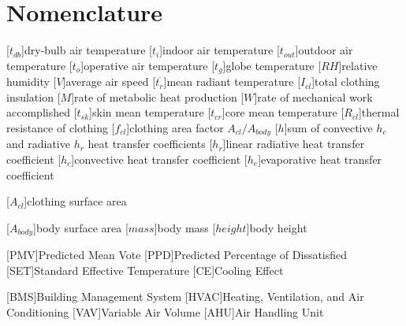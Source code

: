 
\section*{Nomenclature}
\renewcommand{\baselinestretch}{0.75}\normalsize
\begin{acronym}[longest]

[$t_{db}$]{dry-bulb air temperature}
[$t_{i}$]{indoor air temperature}
[$t_{out}$]{outdoor air temperature}
[$t_{o}$]{operative air temperature}
[$t_{g}$]{globe temperature}
[$RH$]{relative humidity\acroextra{, \%}}
[$V$]{average air speed}
[$\overline{t_{r}}$]{mean radiant temperature}
[$I_{cl}$]{total clothing insulation}
[$M$]{rate of metabolic heat production}
[$W$]{rate of mechanical work accomplished}
[$t_{sk}$]{skin mean temperature}
[$t_{cr}$]{core mean temperature}
[$R_{cl}$]{thermal resistance of clothing}
[$f_{cl}$]{clothing area factor $A_{cl}/A_{body}$}
[$h$]{sum of convective $h_{c}$ and radiative $h_{r}$ heat transfer coefficients}
[$h_{r}$]{linear radiative heat transfer coefficient}
[$h_{c}$]{convective heat transfer coefficient}
[$h_{e}$]{evaporative heat transfer coefficient}

[$A_{cl}$]{clothing surface area}

[$A_{body}$]{body surface area}
[$mass$]{body mass}
[$height$]{body height}

[PMV]{Predicted Mean Vote}
[PPD]{Predicted Percentage of Dissatisfied\acroextra{, \%}}
[SET]{Standard Effective Temperature}
[CE]{Cooling Effect}

[BMS]{Building Management System}
[HVAC]{Heating, Ventilation, and Air Conditioning}
[VAV]{Variable Air Volume}
[AHU]{Air Handling Unit}


\end{acronym}
